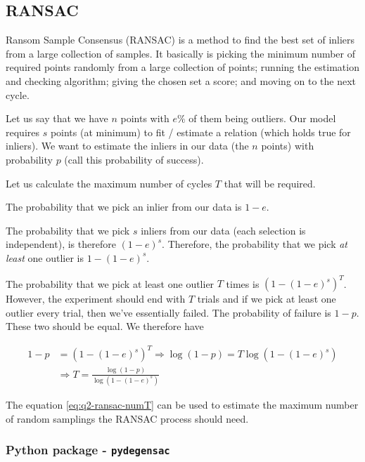 
\subsection{RANSAC}

Ransom Sample Consensus (RANSAC) is a method to find the best set of inliers from a large collection of samples. It basically is picking the minimum number of required points randomly from a large collection of points; running the estimation and checking algorithm; giving the chosen set a score; and moving on to the next cycle.

Let us say that we have $n$ points with $e \%$ of them being outliers. Our model requires $s$ points (at minimum) to fit / estimate a relation (which holds true for inliers). We want to estimate the inliers in our data (the $n$ points) with probability $p$ (call this probability of success).

Let us calculate the maximum number of cycles $T$ that will be required.

The probability that we pick an inlier from our data is $1-e$.

The probability that we pick $s$ inliers from our data (each selection is independent), is therefore $(1-e)^s$. Therefore, the probability that we pick \emph{at least} one outlier is $1-(1-e)^s$.

The probability that we pick at least one outlier $T$ times is $\left(1-(1-e)^s\right)^T$. However, the experiment should end with $T$ trials and if we pick at least one outlier every trial, then we've essentially failed. The probability of failure is $1-p$. These two should be equal. We therefore have

\begin{align}
    1 - p &= \left(1-(1-e)^s\right)^T
    \Rightarrow \log(1-p) = T \log(1-(1-e)^s) 
    \nonumber \\
    &\Rightarrow T = \frac{\log(1-p)}{\log(1-(1-e)^s)}
    \label{eq:q2-ransac-numT}
\end{align}

The equation \ref{eq:q2-ransac-numT} can be used to estimate the maximum number of random samplings the RANSAC process should need.

\subsubsection*{Python package - \texttt{pydegensac}}

